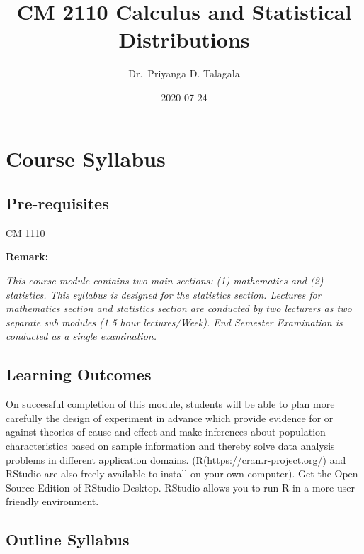 \documentclass[]{book}
\title{CM 2110 Calculus and Statistical Distributions}
\author{Dr.~Priyanga D. Talagala}
\date{2020-07-24}
\begin{document}
\maketitle

{
\setcounter{tocdepth}{1}
\tableofcontents
}
\hypertarget{course-syllabus}{%
\chapter*{Course Syllabus}\label{course-syllabus}}

\hypertarget{pre-requisites}{%
\section*{Pre-requisites}\label{pre-requisites}}

CM 1110

\textbf{Remark:}

\emph{This course module contains two main sections: (1) mathematics and (2) statistics. This syllabus is designed for the statistics section. Lectures for mathematics section and statistics section are conducted by two lecturers as two separate sub modules (1.5 hour lectures/Week). End Semester Examination is conducted as a single examination.}

\hypertarget{learning-outcomes}{%
\section*{Learning Outcomes}\label{learning-outcomes}}

On successful completion of this module, students will be able to plan more carefully the design of experiment in advance which provide evidence for or against theories of cause and effect and make inferences about population characteristics based on sample information and thereby solve data analysis problems in different application domains. (R(\url{https://cran.r-project.org/}) and RStudio are also freely available to install on your own computer). Get the Open Source Edition of RStudio Desktop. RStudio allows you to run R in a more user-friendly environment.

\hypertarget{outline-syllabus}{%
\section*{Outline Syllabus}\label{outline-syllabus}}
\end{document}
